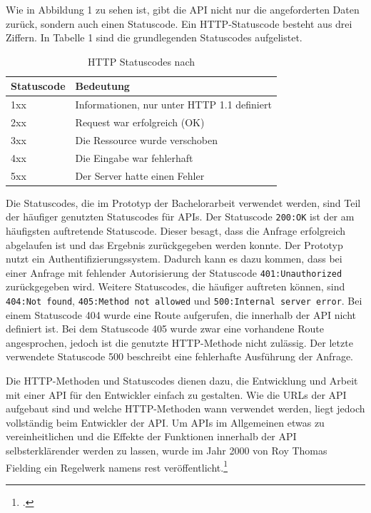 Wie in Abbildung 1 zu sehen ist, gibt die API nicht nur die angeforderten Daten zurück, sondern auch einen Statuscode. Ein HTTP-Statuscode besteht aus drei Ziffern. In Tabelle 1 sind die grundlegenden Statuscodes aufgelistet.

\begin{table}[H]
\centering
\begin{tabular}{l|l}
\textbf{Statuscode} & \textbf{Bedeutung} \\
\hline
1xx & Informationen, nur unter HTTP 1.1 definiert \\
2xx & Request war erfolgreich (OK) \\
3xx & Die Ressource wurde verschoben \\
4xx & Die Eingabe war fehlerhaft \\
5xx & Der Server hatte einen Fehler \\
\end{tabular}
\caption{HTTP Statuscodes nach \cite{doglio2015pro}}
\end{table}

Die Statuscodes, die im Prototyp der Bachelorarbeit verwendet werden, sind Teil der häufiger genutzten Statuscodes für APIs. Der Statuscode \texttt{200:OK} ist der am häufigsten auftretende Statuscode. Dieser besagt, dass die Anfrage erfolgreich abgelaufen ist und das Ergebnis zurückgegeben werden konnte. Der Prototyp nutzt ein Authentifizierungssystem. Dadurch kann es dazu kommen, dass bei einer Anfrage mit fehlender Autorisierung der Statuscode \texttt{401:Unauthorized} zurückgegeben wird. Weitere Statuscodes, die häufiger auftreten können, sind \texttt{404:Not found}, \texttt{405:Method not allowed} und \texttt{500:Internal server error}. Bei einem Statuscode 404 wurde eine Route aufgerufen, die innerhalb der API nicht definiert ist. Bei dem Statuscode 405 wurde zwar eine vorhandene Route angesprochen, jedoch ist die genutzte HTTP-Methode nicht zulässig. Der letzte verwendete Statuscode 500 beschreibt eine fehlerhafte Ausführung der Anfrage. 

Die HTTP-Methoden und Statuscodes dienen dazu, die Entwicklung und Arbeit mit einer API für den Entwickler einfach zu gestalten. Wie die URLs der API aufgebaut sind und welche HTTP-Methoden wann verwendet werden, liegt jedoch vollständig beim Entwickler der API. Um APIs im Allgemeinen etwas zu vereinheitlichen und die Effekte der Funktionen innerhalb der API selbsterklärender werden zu lassen, wurde im Jahr 2000 von Roy Thomas Fielding ein Regelwerk namens \ac{rest} veröffentlicht.\footcite{fielding2000rest}

